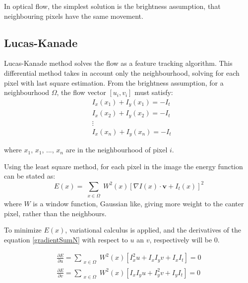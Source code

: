 \documentclass[12pt,a4paper,twoside]{report}
\begin{document}
{In optical flow, the simplest solution is the brightness assumption, that neighbouring pixels have the same movement.

\subsection{Lucas-Kanade}
Lucas-Kanade method \cite{lucas1981} solves the flow as a feature tracking algorithm. This differential method takes in account only the neighbourhood, solving for each pixel with last square estimation. From the brightness assumption, for a neighbourhood $\Omega$, the flow vector $[u_i,v_i]$ must satisfy: 
\begin{equation}
\begin{split}
	&I_x(x_1)+I_y(x_1) = - I_t	\\
	&I_x(x_2)+I_y(x_2) = - I_t \\
	&\vdots \\
	&I_x(x_n)+I_y(x_n) = - I_t 
	\end{split}
\end{equation} 

where $x_1$, $x_1$,  $...$,  $x_n$ are in the neighbourhood of pixel $i$.

Using the least square method, for each pixel in the image the energy function can be stated as:
\begin{equation} \label{gradientSumN}
	E(x) = \sum_{\substack{x \in \Omega}}
	 W^2(x)[\nabla I(x)\cdot \boldsymbol{v}+I_t(x)]^2
\end{equation}
where $W$ is a window function, Gaussian like, giving more weight to the canter pixel, rather than the neighbours.

To minimize $E(x)$, variational calculus is applied, and the derivatives of the equation \ref{gradientSumN} with respect to $u$ an $v$, respectively will be 0.

\begin{equation}
	\begin{split}
	\frac{\partial E}{\partial u} =  \sum_{\substack{x \in \Omega}}
	W^2(x)[I_x^2 u + I_x I_y v + I_x I_t] = 0 \\ 
	\frac{\partial E}{\partial v} =  \sum_{\substack{x \in \Omega}}
	W^2(x)[ I_x I_y u + I_y^2 v + I_y I_t]  = 0
	\end{split}
\end{equation}

}
\end{document}
